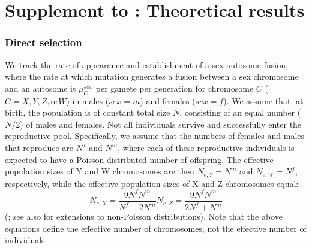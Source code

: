 \chapter{Supplement to : Theoretical results}

\subsection{Direct selection}

We track the rate of appearance and establishment of a sex-autosome fusion, where the rate at which mutation generates a fusion between a sex chromosome and an autosome is $\mu^{sex}_C$ per gamete per generation for chromosome $C$ ($C = X, Y, Z, \text{or} W$) in males ($sex = m$) and females ($sex = f$). We assume that, at birth, the population is of constant total size $N$, consisting of an equal number ($N/\text{2}$) of males and females. Not all individuals survive and successfully enter the reproductive pool. Specifically, we assume that the numbers of females and males that reproduce are $N^f$ and $N^m$, where each of these reproductive individuals is expected to have a Poisson distributed number of offspring. The effective population sizes of Y and W chromosomes are then $N_{e,Y}=N^m$ and $N_{e,W}=N^f$, respectively, while the effective population sizes of X and Z chromosomes equal:
\begin{subequations}
\begin{equation}
N_{e,X} = \frac{\text{9}N^fN^m}{N^f + \text{2}N^m}
\end{equation}
\begin{equation}
N_{e,Z} = \frac{\text{9}N^fN^m}{\text{2}N^f + N^m}
\end{equation}
\end{subequations}
(\citealt{Wright1933}; see also \citealt{Caballero1995} for extensions to non-Poisson distributions). Note that the above equations define the effective number of chromosomes, not the effective number of individuals.

